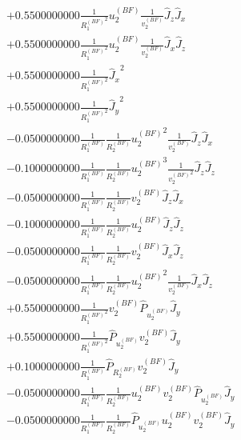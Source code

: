\documentclass[10pt]{article}
\begin{document}
\begin{align*}
     & +0.5500000000 \frac{1}{{R_1^{(BF)}}^{2}} {u_2^{(BF)}} \frac{1}{{v_2^{(BF)}}} {\hat{J}_z} {\hat{J}_x} \\
     & +0.5500000000 \frac{1}{{R_1^{(BF)}}^{2}} {u_2^{(BF)}} \frac{1}{{v_2^{(BF)}}} {\hat{J}_x} {\hat{J}_z} \\
     & +0.5500000000 \frac{1}{{R_1^{(BF)}}^{2}} {\hat{J}_x}^{2} \\
     & +0.5500000000 \frac{1}{{R_1^{(BF)}}^{2}} {\hat{J}_y}^{2} \\
     & -0.0500000000 \frac{1}{{R_1^{(BF)}}} \frac{1}{{R_2^{(BF)}}} {u_2^{(BF)}}^{2} \frac{1}{{v_2^{(BF)}}} {\hat{J}_z} {\hat{J}_x} \\
     & -0.1000000000 \frac{1}{{R_1^{(BF)}}} \frac{1}{{R_2^{(BF)}}} {u_2^{(BF)}}^{3} \frac{1}{{v_2^{(BF)}}^{2}} {\hat{J}_z} {\hat{J}_z} \\
     & -0.0500000000 \frac{1}{{R_1^{(BF)}}} \frac{1}{{R_2^{(BF)}}} {v_2^{(BF)}} {\hat{J}_z} {\hat{J}_x} \\
     & -0.1000000000 \frac{1}{{R_1^{(BF)}}} \frac{1}{{R_2^{(BF)}}} {u_2^{(BF)}} {\hat{J}_z} {\hat{J}_z} \\
     & -0.0500000000 \frac{1}{{R_1^{(BF)}}} \frac{1}{{R_2^{(BF)}}} {v_2^{(BF)}} {\hat{J}_x} {\hat{J}_z} \\
     & -0.0500000000 \frac{1}{{R_1^{(BF)}}} \frac{1}{{R_2^{(BF)}}} {u_2^{(BF)}}^{2} \frac{1}{{v_2^{(BF)}}} {\hat{J}_x} {\hat{J}_z} \\
     & +0.5500000000 \frac{1}{{R_1^{(BF)}}^{2}} {v_2^{(BF)}} {\hat{P}_{u_2^{(BF)}}} {\hat{J}_y} \\
     & +0.5500000000 \frac{1}{{R_1^{(BF)}}^{2}} {\hat{P}_{u_2^{(BF)}}} {v_2^{(BF)}} {\hat{J}_y} \\
     & +0.1000000000 \frac{1}{{R_1^{(BF)}}} {\hat{P}_{R_2^{(BF)}}} {v_2^{(BF)}} {\hat{J}_y} \\
     & -0.0500000000 \frac{1}{{R_1^{(BF)}}} \frac{1}{{R_2^{(BF)}}} {u_2^{(BF)}} {v_2^{(BF)}} {\hat{P}_{u_2^{(BF)}}} {\hat{J}_y} \\
     & -0.0500000000 \frac{1}{{R_1^{(BF)}}} \frac{1}{{R_2^{(BF)}}} {\hat{P}_{u_2^{(BF)}}} {u_2^{(BF)}} {v_2^{(BF)}} {\hat{J}_y} \\
 \end{align*}

 
\end{document}
